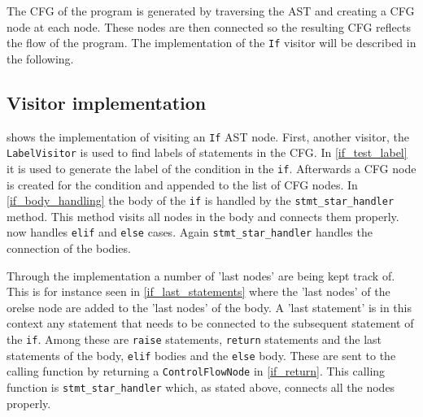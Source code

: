 The CFG of the program is generated by traversing the AST and creating a CFG node at each node.
These nodes are then connected so the resulting CFG reflects the flow of the program.
The implementation of the \texttt{If} visitor will be described in the following.

\subsection{Visitor implementation}
 shows the implementation of visiting an \texttt{If} AST node.
First, another visitor, the \texttt{LabelVisitor} is used to find labels of statements in the CFG.
In \cref{if_test_label} it is used to generate the label of the condition in the \texttt{if}.
Afterwards a CFG node is created for the condition and appended to the list of CFG nodes.
In \cref{if_body_handling} the body of the \texttt{if} is handled by the \texttt{stmt\_star\_handler} method.
This method visits all nodes in the body and connects them properly.
 now handles \texttt{elif} and \texttt{else} cases.
Again \texttt{stmt\_star\_handler} handles the connection of the bodies.

Through the implementation a number of 'last nodes' are being kept track of.
This is for instance seen in \cref{if_last_statements} where the 'last nodes' of the orelse node are added to the 'last nodes' of the body.
A 'last statement' is in this context any statement that needs to be connected to the subsequent statement of the \texttt{if}.
Among these are \texttt{raise} statements, \texttt{return} statements and the last statements of the body, \texttt{elif} bodies and the \texttt{else} body. 
These are sent to the calling function by returning a \texttt{ControlFlowNode} in \cref{if_return}.
This calling function is \texttt{stmt\_star\_handler} which, as stated above, connects all the nodes properly.

